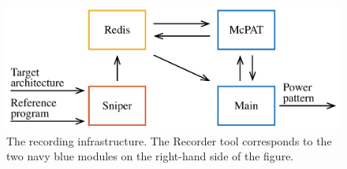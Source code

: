 \begin{figure}
  \centering
  \includegraphics[width=1.0\columnwidth]{include/assets/figures/recorder.pdf}
  \caption{The recording infrastructure. The Recorder tool corresponds to the
  two navy blue modules on the right-hand side of the figure.}
\end{figure}
